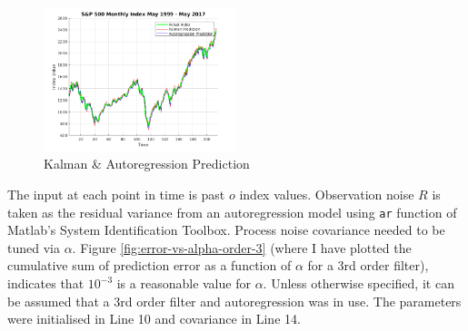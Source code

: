 \documentclass[11pt, fleqn]{article}
\begin{document}
\begin{figure}
  	\centering
  	\includegraphics[width=0.5\textwidth]{kalman-autoreg-pred.png}
	\caption{Kalman \& Autoregression Prediction}
	\label{fig:kalman-autoreg-pred}
	\vspace{-1cm}
\end{figure}

The input at each point in time is past $o$ index values. Observation noise $R$ is taken as the residual variance from an autoregression model using \texttt{ar} function of Matlab's System Identification Toolbox. Process noise covariance needed to be tuned via $\alpha$. Figure \ref{fig:error-vs-alpha-order-3} (where I have plotted the cumulative sum of prediction error as a function of $\alpha$ for a 3rd order filter), indicates that $10^{-3}$ is a reasonable value for $\alpha$. Unless otherwise specified, it can be assumed that a 3rd order filter and autoregression was in use. The parameters were initialised in Line 10 and covariance in Line 14.\\
\end{document}
